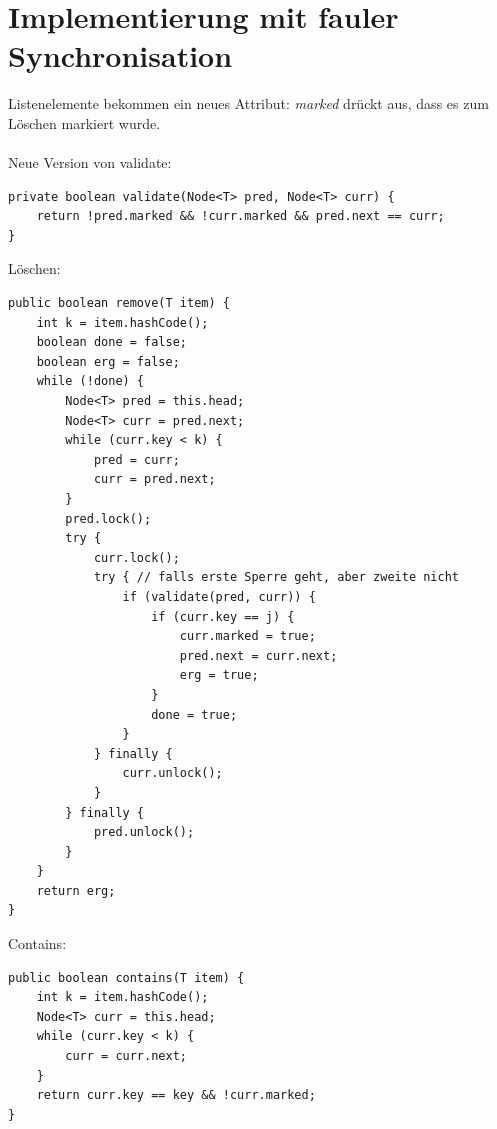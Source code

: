 \section{Implementierung mit fauler Synchronisation}
Listenelemente bekommen ein neues Attribut: \emph{marked} drückt aus, dass es zum Löschen markiert wurde.\\
\\
Neue Version von validate:
\begin{lstlisting}
private boolean validate(Node<T> pred, Node<T> curr) {
	return !pred.marked && !curr.marked && pred.next == curr;
}
\end{lstlisting}
Löschen:
\begin{lstlisting}
public boolean remove(T item) {
	int k = item.hashCode();
	boolean done = false;
	boolean erg = false;
	while (!done) {
		Node<T> pred = this.head;
		Node<T> curr = pred.next;
		while (curr.key < k) {
			pred = curr;
			curr = pred.next;
		}
		pred.lock();
		try {
			curr.lock();
			try { // falls erste Sperre geht, aber zweite nicht
				if (validate(pred, curr)) {
					if (curr.key == j) {
						curr.marked = true;
						pred.next = curr.next;
						erg = true;
					}
					done = true;
				}
			} finally {
				curr.unlock();
			}
		} finally {
			pred.unlock();
		}
	}
	return erg;
}
\end{lstlisting}
Contains:
\begin{lstlisting}
public boolean contains(T item) {
	int k = item.hashCode();
	Node<T> curr = this.head;
	while (curr.key < k) {
		curr = curr.next;
	}
	return curr.key == key && !curr.marked;
}
\end{lstlisting}